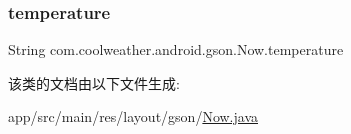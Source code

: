 \mbox{\label{classcom_1_1coolweather_1_1android_1_1gson_1_1_now_a6cb643a0e50bd3e4d7c673404e55cc1a}} 
\subsubsection{\texorpdfstring{temperature}{temperature}}
{\footnotesize\ttfamily String com.\+coolweather.\+android.\+gson.\+Now.\+temperature}



该类的文档由以下文件生成\+:\begin{DoxyCompactItemize}
\item 
app/src/main/res/layout/gson/\mbox{\hyperlink{res_2layout_2gson_2_now_8java}{Now.\+java}}\end{DoxyCompactItemize}

